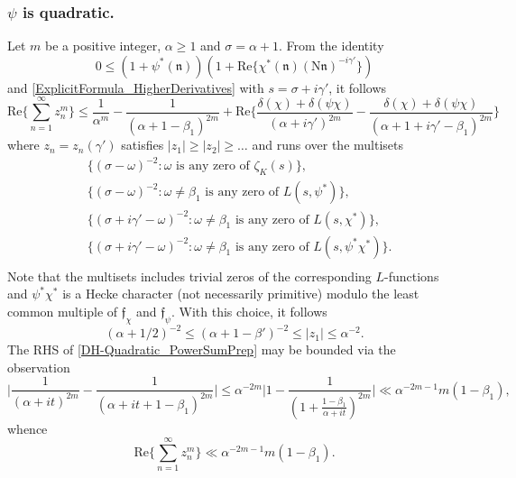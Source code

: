 \documentclass[12pt,psamsfonts]{amsart}
\theoremstyle{definition}
\theoremstyle{remark}
\numberwithin{equation}{section}
\theoremstyle{plain}
\theoremstyle{remark}
\renewcommand{\1}{ {\bf 1}}
\newcommand{\kf}{\mathfrak{f}}
\newcommand{\kn}{\mathfrak{n}}
\newcommand{\N}{\mathrm{N}}
\renewcommand{\Re}{\mathrm{Re}}
\begin{document}
\subsubsection{$\psi$ is quadratic.}
\label{DH-MainTheorem_Quadratic}
Let $m$ be a positive integer, $\alpha \geq 1$ and $\sigma = \alpha+1$.  From the identity
\[
0 \leq (1+\psi^*(\kn) )(1+ \Re\{ \chi^*(\kn) (\N\kn)^{-i\gamma'} \} )
\]
and \cref{ExplicitFormula_HigherDerivatives} with $s = \sigma+i\gamma'$, it follows 
\begin{equation}
\Re\Big\{ \sum_{n=1}^{\infty}  z_n^m \Big\} \leq \frac{1}{\alpha^m} - \frac{1}{(\alpha+1-\beta_1)^{2m}} + \Re\Big\{ \frac{\delta(\chi)+\delta(\psi \chi)}{(\alpha+i\gamma')^{2m}} - \frac{\delta(\chi)+\delta(\psi\chi)}{(\alpha +1+i\gamma' -\beta_1)^{2m}} \Big\} 
\label{DH-Quadratic_PowerSumPrep}
\end{equation}
where $z_n = z_n(\gamma')$ satisfies $|z_1| \geq |z_2| \geq \dots$ and runs over the multisets
\begin{equation}
\begin{aligned}
& \{  (\sigma-\omega)^{-2} :  \omega \text{ is any zero of $\zeta_K(s)$} \}, \\
& \{  (\sigma-\omega)^{-2}  :  \omega \neq \beta_1 \text{ is any zero of $L(s, \psi^*)$} \}, \\
& \{  (\sigma+i\gamma'-\omega)^{-2}  :  \omega \neq \beta_1 \text{ is any zero of $L(s, \chi^*)$} \}, \\
& \{  (\sigma+i\gamma'-\omega)^{-2}  :  \omega \neq \beta_1 \text{ is any zero of $L(s, \psi^*\chi^*)$} \}. \\
\end{aligned}
\label{DH-Quadratic_z_n}
\end{equation}
Note that the multisets includes trivial zeros of the corresponding $L$-functions and $\psi^*\chi^*$ is a Hecke character (not necessarily primitive) modulo the least common multiple of $\kf_{\chi}$ and $\kf_{\psi}$. With this choice, it follows
\begin{equation}
(\alpha+1/2)^{-2} \leq (\alpha+1-\beta')^{-2} \leq |z_1| \leq \alpha^{-2}. 
\label{DH-zProperty}
\end{equation}
The RHS of  \eqref{DH-Quadratic_PowerSumPrep} may be bounded via the observation
\[
\Big| \frac{1}{(\alpha+it)^{2m}} - \frac{1}{(\alpha + it + 1-\beta_1)^{2m}} \Big| \leq \alpha^{-2m} \Big| 1 - \frac{1}{(1 + \frac{1-\beta_1}{\alpha+it})^{2m} } \Big|   \ll \alpha^{-2m-1} m(1-\beta_1),
\]
whence
\begin{equation}
\Re\Big\{ \sum_{n=1}^{\infty}  z_n^m \Big\} \ll \alpha^{-2m-1} m(1-\beta_1). 
\label{DH-PowerSum_RHS}
\end{equation}
\end{document}
